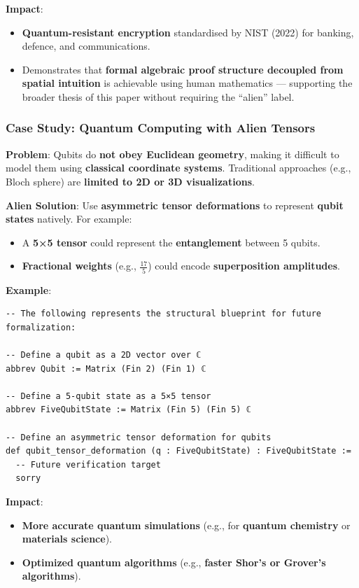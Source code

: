 \documentclass[11pt, a4paper]{article}
\begin{document}
\textbf{Impact}:
\begin{itemize}
    \item \textbf{Quantum-resistant encryption} standardised by NIST (2022) for banking, defence, and communications.
    \item Demonstrates that \textbf{formal algebraic proof structure decoupled from spatial intuition} is achievable using human mathematics --- supporting the broader thesis of this paper without requiring the ``alien'' label.
\end{itemize}


\subsubsection{Case Study: Quantum Computing with Alien Tensors}
\textbf{Problem}: Qubits do \textbf{not obey Euclidean geometry}, making it difficult to model them using \textbf{classical coordinate systems}. Traditional approaches (e.g., Bloch sphere) are \textbf{limited to 2D or 3D visualizations}.

\textbf{Alien Solution}: Use \textbf{asymmetric tensor deformations} to represent \textbf{qubit states} natively. For example:
\begin{itemize}
    \item A \textbf{5×5 tensor} could represent the \textbf{entanglement} between 5 qubits.
    \item \textbf{Fractional weights} (e.g., \(\frac{17}{5}\)) could encode \textbf{superposition amplitudes}.
\end{itemize}

\textbf{Example}:
\begin{lstlisting}[language=Lean, caption=Alien Tensors Blueprint for Quantum Computing, label=lst:lean_quantum]
-- The following represents the structural blueprint for future formalization:

-- Define a qubit as a 2D vector over ℂ
abbrev Qubit := Matrix (Fin 2) (Fin 1) ℂ

-- Define a 5-qubit state as a 5×5 tensor
abbrev FiveQubitState := Matrix (Fin 5) (Fin 5) ℂ

-- Define an asymmetric tensor deformation for qubits
def qubit_tensor_deformation (q : FiveQubitState) : FiveQubitState :=
  -- Future verification target
  sorry
\end{lstlisting}

\textbf{Impact}:
\begin{itemize}
    \item \textbf{More accurate quantum simulations} (e.g., for \textbf{quantum chemistry} or \textbf{materials science}).
    \item \textbf{Optimized quantum algorithms} (e.g., \textbf{faster Shor’s or Grover’s algorithms}).
\end{itemize}
\end{document}
